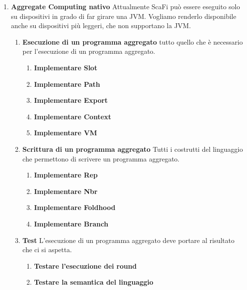 \documentclass[12pt, a4paper]{article}
\begin{document}
\begin{enumerate}
    \item \textbf{Aggregate Computing nativo} Attualmente ScaFi può essere eseguito solo su dispositivi in grado di 
    far girare una JVM. Vogliamo renderlo disponibile anche su dispositivi più leggeri, che non supportano la JVM.
        \begin{enumerate}
            \item \textbf{Esecuzione di un programma aggregato} tutto quello che è necessario per l'esecuzione 
            di un programma aggregato.
                \begin{enumerate}
                    \item \textbf{Implementare Slot} 
                    \item \textbf{Implementare Path}
                    \item \textbf{Implementare Export}
                    \item \textbf{Implementare Context}
                    \item \textbf{Implementare VM}
                \end{enumerate}

            \item \textbf{Scrittura di un programma aggregato} Tutti i costrutti del linguaggio che permettono di 
            scrivere un programma aggregato.
                \begin{enumerate}
                    \item \textbf{Implementare Rep}
                    \item \textbf{Implementare Nbr}
                    \item \textbf{Implementare Foldhood}
                    \item \textbf{Implementare Branch}
                \end{enumerate}

            \item \textbf{Test} L'esecuzione di un programma aggregato deve portare al risultato che ci si aspetta.
                \begin{enumerate}
                    \item \textbf{Testare l'esecuzione dei round}
                    \item \textbf{Testare la semantica del linguaggio}
                \end{enumerate}
        \end{enumerate}


\end{enumerate}
\end{document}

